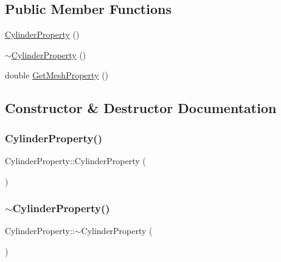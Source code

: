 \subsection*{Public Member Functions}
\begin{DoxyCompactItemize}
\item 
\mbox{\hyperlink{class_cylinder_property_a8ab6a23b5101fbf80dad6f48c77c3cf2}{Cylinder\+Property}} ()
\item 
\mbox{\hyperlink{class_cylinder_property_a818aa95f4dfd6b863878ecab75dd9521}{$\sim$\+Cylinder\+Property}} ()
\item 
double \mbox{\hyperlink{class_cylinder_property_a9e5b9bf44af9e9284004b1674c2f4837}{Get\+Mesh\+Property}} ()
\end{DoxyCompactItemize}


\subsection{Constructor \& Destructor Documentation}
\mbox{\label{class_cylinder_property_a8ab6a23b5101fbf80dad6f48c77c3cf2}} 
\subsubsection{\texorpdfstring{CylinderProperty()}{CylinderProperty()}}
{\footnotesize\ttfamily Cylinder\+Property\+::\+Cylinder\+Property (\begin{DoxyParamCaption}{ }\end{DoxyParamCaption})}

\mbox{\label{class_cylinder_property_a818aa95f4dfd6b863878ecab75dd9521}} 
\subsubsection{\texorpdfstring{$\sim$CylinderProperty()}{~CylinderProperty()}}
{\footnotesize\ttfamily Cylinder\+Property\+::$\sim$\+Cylinder\+Property (\begin{DoxyParamCaption}{ }\end{DoxyParamCaption})}



